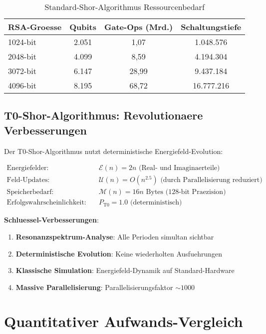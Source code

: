 \documentclass[12pt,a4paper]{article}
\begin{document}
	\begin{table}[htbp]
		\centering
		\begin{tabular}{lccc}
			\toprule
			\textbf{RSA-Groesse} & \textbf{Qubits} & \textbf{Gate-Ops (Mrd.)} & \textbf{Schaltungstiefe} \\
			\midrule
			1024-bit & 2.051 & 1,07 & 1.048.576 \\
			2048-bit & 4.099 & 8,59 & 4.194.304 \\
			3072-bit & 6.147 & 28,99 & 9.437.184 \\
			4096-bit & 8.195 & 68,72 & 16.777.216 \\
			\bottomrule
		\end{tabular}
		\caption{Standard-Shor-Algorithmus Ressourcenbedarf}
		\label{tab:standard_shor}
	\end{table}
	
	\subsection{T0-Shor-Algorithmus: Revolutionaere Verbesserungen}
	
	Der T0-Shor-Algorithmus nutzt deterministische Energiefeld-Evolution:
	
	\begin{align}
		\text{Energiefelder}: \quad &\mathcal{E}(n) = 2n \text{ (Real- und Imaginaerteile)} \\
		\text{Feld-Updates}: \quad &\mathcal{U}(n) = O(n^{2.5}) \text{ (durch Parallelisierung reduziert)} \\
		\text{Speicherbedarf}: \quad &\mathcal{M}(n) = 16n \text{ Bytes (128-bit Praezision)} \\
		\text{Erfolgswahrscheinlichkeit}: \quad &P_{\text{T0}} = 1.0 \text{ (deterministisch)}
	\end{align}
	
	\textbf{Schluessel-Verbesserungen}:
	\begin{enumerate}
		\item \textbf{Resonanzspektrum-Analyse}: Alle Perioden simultan sichtbar
		\item \textbf{Deterministische Evolution}: Keine wiederholten Ausfuehrungen
		\item \textbf{Klassische Simulation}: Energiefeld-Dynamik auf Standard-Hardware
		\item \textbf{Massive Parallelisierung}: Parallelisierungsfaktor $\sim 1000$
	\end{enumerate}
	
	\section{Quantitativer Aufwands-Vergleich}
	
\end{document}
